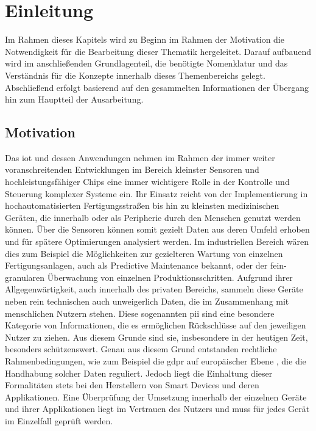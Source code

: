 
\section{Einleitung}
\label{sec:Einleitung}

Im Rahmen dieses Kapitels wird zu Beginn im Rahmen der Motivation die Notwendigkeit für die Bearbeitung dieser Thematik hergeleitet. Darauf aufbauend wird im anschließenden Grundlagenteil, die benötigte Nomenklatur und das Verständnis für die Konzepte innerhalb dieses Themenbereichs gelegt. Abschließend erfolgt basierend auf den gesammelten Informationen der Übergang hin zum Hauptteil der Ausarbeitung.

\subsection{Motivation}
\label{sec:Einleitung:ssec:Motivation}

Das \ac{iot} und dessen Anwendungen nehmen im Rahmen der immer weiter voranschreitenden Entwicklungen im Bereich kleinster Sensoren und hochleistungsfähiger Chips eine immer wichtigere Rolle in der Kontrolle und Steuerung komplexer Systeme ein. 
Ihr Einsatz reicht von der Implementierung in hochautomatisierten Fertigungsstraßen bis hin zu kleinsten medizinischen Geräten, die innerhalb oder als Peripherie durch den Menschen genutzt werden können. Über die Sensoren können somit gezielt Daten aus deren Umfeld erhoben und für spätere Optimierungen analysiert werden. Im industriellen Bereich wären dies zum Beispiel die Möglichkeiten zur gezielteren Wartung von einzelnen Fertigungsanlagen, auch als Predictive Maintenance bekannt, oder der fein-granularen Überwachung von einzelnen Produktionsschritten. 
Aufgrund ihrer Allgegenwärtigkeit, auch innerhalb des privaten Bereichs, sammeln diese Geräte neben rein technischen auch unweigerlich Daten, die im Zusammenhang mit menschlichen Nutzern stehen. Diese sogenannten \ac{pii} sind eine besondere Kategorie von Informationen, die es ermöglichen Rückschlüsse auf den jeweiligen Nutzer zu ziehen. Aus diesem Grunde sind sie, insbesondere in der heutigen Zeit, besonders schützenswert.
Genau aus diesem Grund entstanden rechtliche Rahmenbedingungen, wie zum Beispiel die \ac{gdpr} auf europäischer Ebene \cite{dsgvo2016}, die die Handhabung solcher Daten reguliert. Jedoch liegt die Einhaltung dieser Formalitäten stets bei den Herstellern von Smart Devices und deren Applikationen. Eine Überprüfung der Umsetzung innerhalb der einzelnen Geräte und ihrer Applikationen liegt im Vertrauen des Nutzers und muss für jedes Gerät im Einzelfall geprüft werden.
